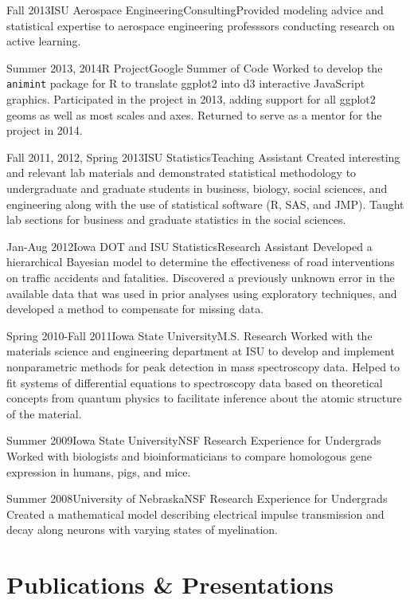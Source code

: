 \documentclass[10pt]{tccv}
\begin{document}
\begin{eventlist}
\item{Fall 2013}{ISU Aerospace Engineering}{Consulting}{Provided modeling advice and statistical expertise to aerospace engineering professsors conducting research on active learning.}

\item{Summer 2013, 2014}{R Project}{Google Summer of Code}{
Worked to develop the \texttt{animint} package for R to translate ggplot2 into d3 interactive JavaScript graphics. Participated in the project in 2013, adding support for all ggplot2 geoms as well as most scales and axes. Returned to serve as a mentor for the project in 2014. \cite{gprug2014}}

\item{Fall 2011, 2012, Spring 2013}{ISU Statistics}{Teaching Assistant}{
Created interesting and relevant lab materials and demonstrated statistical methodology to undergraduate and graduate students in business, biology, social sciences, and engineering along with the use of statistical software (R, SAS, and JMP). Taught lab sections for business and graduate statistics in the social sciences.}

\item{Jan-Aug 2012}{Iowa DOT and ISU Statistics}{Research Assistant}{
Developed a hierarchical Bayesian model to determine the effectiveness of road interventions on traffic accidents and fatalities. Discovered a previously unknown error in the available data that was used in prior analyses using exploratory techniques, and developed a method to compensate for missing data. }

\item{Spring 2010-Fall 2011}{Iowa State University}{M.S. Research}{
Worked with the materials science and engineering department at ISU to develop and implement nonparametric methods for peak detection in mass spectroscopy data. Helped to fit systems of differential equations to spectroscopy data based on theoretical concepts from quantum physics to facilitate inference about the atomic structure of the material. }

\item{Summer 2009}{Iowa State University}{NSF Research Experience for Undergrads}{
Worked with biologists and bioinformaticians to compare homologous gene expression in humans, pigs, and mice.\cite{towfic2010detection}}  

\item{Summer 2008}{University of Nebraska}{NSF Research Experience for Undergrads}{
Created a mathematical model describing electrical impulse transmission and decay along neurons with varying states of myelination.}
\end{eventlist}

\vspace{4.5in}
\section{Publications \& Presentations}


\nocite{*}
\end{document}

